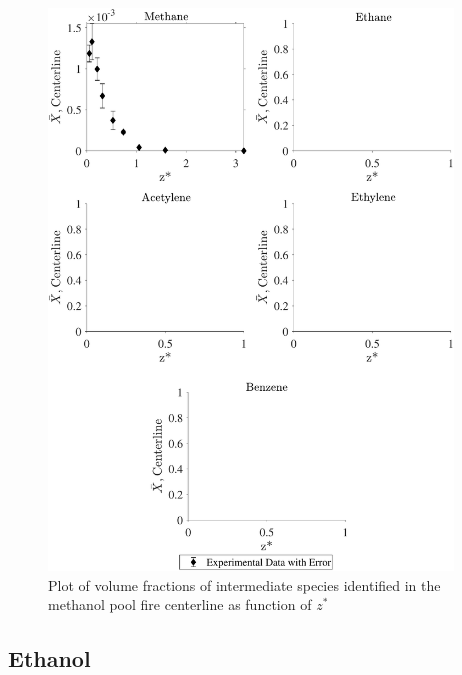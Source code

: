 \documentclass[12pt]{article}
\begin{document}
\begin{figure}[!h]
	\centering
\includegraphics[width=10.75cm,keepaspectratio]{Methanol_Inter_MOL_FRAC_Plot.pdf}
	\caption[Volume fractions of intermediate species in the methanol plume]{Plot of volume fractions of intermediate species identified in the methanol pool fire centerline as function of $z^{*}$}
	\label{fig:Methanol_VOL_Frac_Inter}
\end{figure}
\pagebreak

\subsection{Ethanol}
\label{ssec:Ethanol_ALL_Vol_Frac}
\end{document}
